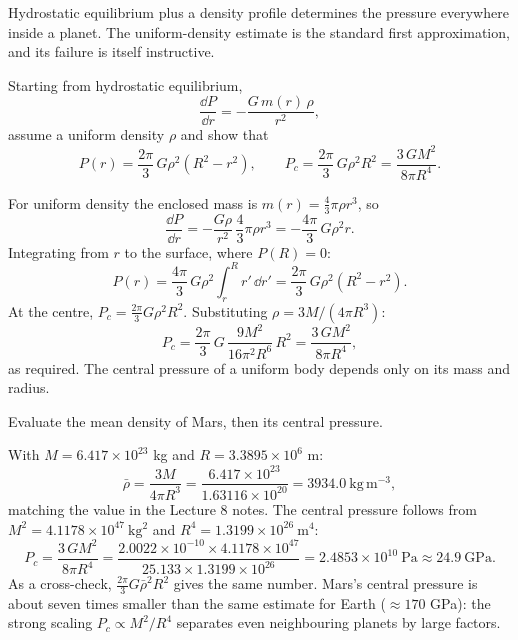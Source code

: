 
Hydrostatic equilibrium plus a density profile determines the pressure everywhere inside a planet.
The uniform-density estimate is the standard first approximation, and its failure is itself instructive.

\parti Starting from hydrostatic equilibrium,
\[
\frac{\dd P}{\dd r} = -\frac{G\,m(r)\,\rho}{r^2},
\]
assume a uniform density $\rho$ and show that
\[
P(r) = \frac{2\pi}{3}\,G \rho^2 \left(R^2 - r^2\right),
\qquad
P_c = \frac{2\pi}{3}\,G \rho^2 R^2 = \frac{3\,G M^2}{8\pi R^4}.
\]

\begin{solution}
For uniform density the enclosed mass is $m(r) = \frac{4}{3}\pi \rho r^3$, so
\[
\frac{\dd P}{\dd r} = -\frac{G \rho}{r^2}\,\frac{4}{3}\pi \rho r^3 = -\frac{4\pi}{3}\,G \rho^2 r.
\]
Integrating from $r$ to the surface, where $P(R) = 0$:
\[
P(r) = \frac{4\pi}{3}\,G\rho^2 \int_r^R r'\,\dd r' = \frac{2\pi}{3}\,G \rho^2 \left(R^2 - r^2\right).
\]
At the centre, $P_c = \frac{2\pi}{3} G \rho^2 R^2$. Substituting $\rho = 3M/(4\pi R^3)$:
\[
P_c = \frac{2\pi}{3}\,G\,\frac{9 M^2}{16 \pi^2 R^6}\,R^2 = \frac{3\,G M^2}{8\pi R^4},
\]
as required. The central pressure of a uniform body depends only on its mass and radius.
\end{solution}

\parti Evaluate the mean density of Mars,
then its central pressure.

\begin{solution}
With $M = 6.417 \times 10^{23}$ kg and $R = 3.3895 \times 10^{6}$ m:
\[
\bar\rho = \frac{3M}{4\pi R^3} = \frac{6.417 \times 10^{23}}{1.63116 \times 10^{20}} = 3934.0\ \mathrm{kg\,m^{-3}},
\]
matching the value in the Lecture 8 notes. The central pressure follows from $M^2 = 4.1178 \times 10^{47}\ \mathrm{kg^2}$ and $R^4 = 1.3199 \times 10^{26}\ \mathrm{m^4}$:
\[
P_c = \frac{3\,G M^2}{8\pi R^4} = \frac{2.0022 \times 10^{-10} \times 4.1178 \times 10^{47}}{25.133 \times 1.3199 \times 10^{26}}
= 2.4853 \times 10^{10}\ \mathrm{Pa} \approx 24.9\ \mathrm{GPa}.
\]
As a cross-check, $\frac{2\pi}{3} G \bar\rho^2 R^2$ gives the same number.
Mars's central pressure is about seven times smaller than the same estimate for Earth ($\approx 170$ GPa):
the strong scaling $P_c \propto M^2/R^4$ separates even neighbouring planets by large factors.
\end{solution}

